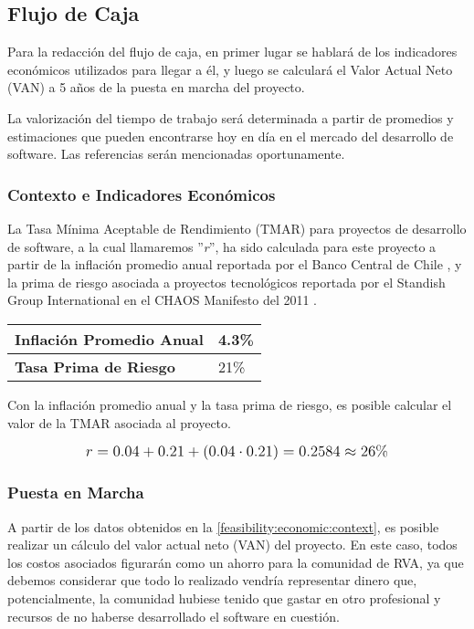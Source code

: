 \subsection{Flujo de Caja}
Para la redacción del flujo de caja, en primer lugar se hablará de los indicadores económicos utilizados para llegar a él, y luego se calculará el Valor Actual Neto (VAN) a 5 años de la puesta en marcha del proyecto.

La valorización del tiempo de trabajo será determinada a partir de promedios y estimaciones que pueden encontrarse hoy en día en el mercado del desarrollo de software. Las referencias serán mencionadas oportunamente.

\subsubsection{Contexto e Indicadores Económicos}
\label{feasibility:economic:context}
La Tasa Mínima Aceptable de Rendimiento (TMAR) para proyectos de desarrollo de software, a la cual llamaremos ''\textit{r}'', ha sido calculada para este proyecto a partir de la inflación promedio anual reportada por el Banco Central de Chile \cite{bancochile}, y la prima de riesgo asociada a proyectos tecnológicos reportada por el Standish Group International en el CHAOS Manifesto del 2011 \cite{big2011chaos}.

\begin{center}
	\begin{tabular}{ | p{7cm} | p{5cm}|}
		\hline
		{\textbf{Inflación Promedio Anual}} & 4.3\%  \\ \hline
		{\textbf{Tasa Prima de Riesgo}} & 21\% \\ \hline
	\end{tabular}

  \label{table:indicators}
\end{center}

Con la inflación promedio anual y la tasa prima de riesgo, es posible calcular el valor de la TMAR asociada al proyecto.

\[
\mathlarger{
  r = 0.04+0.21+(0.04\cdot0.21) = 0.2584 \approx 26\%
}
\]

\subsubsection{Puesta en Marcha}
\label{feasibility:economic:startup}
A partir de los datos obtenidos en la \autoref{feasibility:economic:context}, es posible realizar un cálculo del valor actual neto (VAN) del proyecto. En este caso, todos los costos asociados figurarán como un ahorro para la comunidad de RVA, ya que debemos considerar que todo lo realizado vendría representar dinero que, potencialmente, la comunidad hubiese tenido que gastar en otro profesional y recursos de no haberse desarrollado el software en cuestión.


